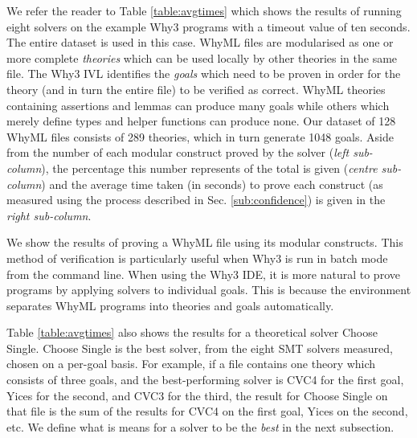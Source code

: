 We refer the reader to Table \ref{table:avgtimes} which shows the results of running eight solvers on the example \textsf{Why3} programs with a timeout value of ten seconds. 
The entire dataset is used in this case. 
WhyML files are modularised as one or more complete \textit{theories} which can be used locally by other theories in the same file. 
The \textsf{Why3} IVL identifies the \textit{goals} which need to be proven in order for the theory (and in turn the entire file) to be verified as correct.
WhyML theories containing assertions and lemmas can produce many goals while others which merely define types and helper functions can produce none. 
Our dataset of 128 WhyML files consists of 289 theories, which in turn generate 1048 goals. 
Aside from the number of each modular construct proved by the solver (\textit{left sub-column}), the percentage this number represents of the total is given (\textit{centre sub-column}) and the average time taken (in seconds) to prove each construct (as measured using the process described in Sec. \ref{sub:confidence}) is given in the \textit{right sub-column}. 

We show the results of proving a WhyML file using its modular constructs. 
This method of verification is particularly useful when \textsf{Why3} is run in batch mode from the command line.
When using the \textsf{Why3} IDE, it is more natural to prove programs by applying solvers to individual goals.
This is because the environment separates WhyML programs into theories and goals automatically.

Table \ref{table:avgtimes} also shows the results for a theoretical solver \textsf{Choose Single}. 
\textsf{Choose Single} is the best solver, from the eight SMT solvers measured, chosen on a per-goal basis. 
For example, if a file contains one theory which consists of three goals, and the best-performing solver is CVC4 for the first goal, Yices for the second, and CVC3 for the third, the result for \textsf{Choose Single} on that file is the sum of the results for CVC4 on the first goal, Yices on the second, etc.
We define what is means for a solver to be the \textit{best} in the next subsection.

